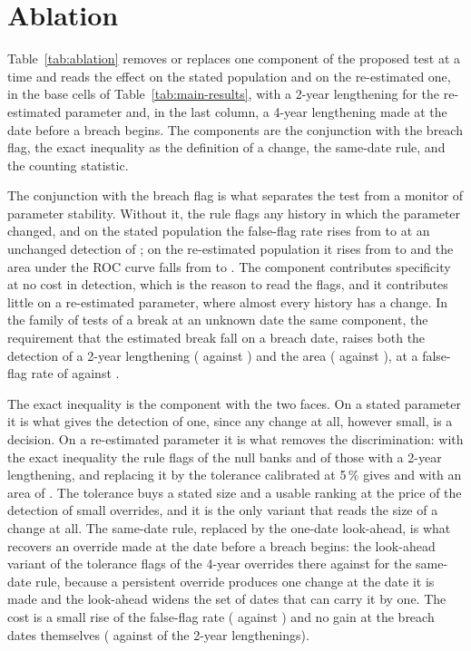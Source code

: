 \section{Ablation}
\label{sec:ablation}

Table~\ref{tab:ablation} removes or replaces one component of the proposed test at a time and reads the effect on the stated population and on the re-estimated one, in the base cells of Table~\ref{tab:main-results}, with a 2-year lengthening for the re-estimated parameter and, in the last column, a 4-year lengthening made at the date before a breach begins. The components are the conjunction with the breach flag, the exact inequality as the definition of a change, the same-date rule, and the counting statistic.



The conjunction with the breach flag is what separates the test from a monitor of parameter stability. Without it, the rule flags any history in which the parameter changed, and on the stated population the false-flag rate rises from \statedNullEngine{} to \statedNullAny{} at an unchanged detection of \statedAltAny{}; on the re-estimated population it rises from \fitNullEngine{} to \fitNullAny{} and the area under the ROC curve falls from \fitAucCEngine{} to \fitAucCAny{}. The component contributes specificity at no cost in detection, which is the reason to read the flags, and it contributes little on a re-estimated parameter, where almost every history has a change. In the family of tests of a break at an unknown date the same component, the requirement that the estimated break fall on a breach date, raises both the detection of a 2-year lengthening (\fitAddCShiftB{} against \fitAddCShift{}) and the area (\fitAucCShiftB{} against \fitAucCShift{}), at a false-flag rate of \fitNullShiftB{} against \fitNullShift{}.

The exact inequality is the component with the two faces. On a stated parameter it is what gives the detection of one, since any change at all, however small, is a decision. On a re-estimated parameter it is what removes the discrimination: with the exact inequality the rule flags \fitNullEngine{} of the null banks and \fitAddCEngine{} of those with a 2-year lengthening, and replacing it by the tolerance calibrated at 5\,\% gives \fitNullTol{} and \fitAddCTol{} with an area of \fitAucCTol{}. The tolerance buys a stated size and a usable ranking at the price of the detection of small overrides, and it is the only variant that reads the size of a change at all. The same-date rule, replaced by the one-date look-ahead, is what recovers an override made at the date before a breach begins: the look-ahead variant of the tolerance flags \earlyTolLaFour{} of the 4-year overrides there against \earlyTolFour{} for the same-date rule, because a persistent override produces one change at the date it is made and the look-ahead widens the set of dates that can carry it by one. The cost is a small rise of the false-flag rate (\fitNullTolLa{} against \fitNullTol{}) and no gain at the breach dates themselves (\fitAddCTolLa{} against \fitAddCTol{} of the 2-year lengthenings).

